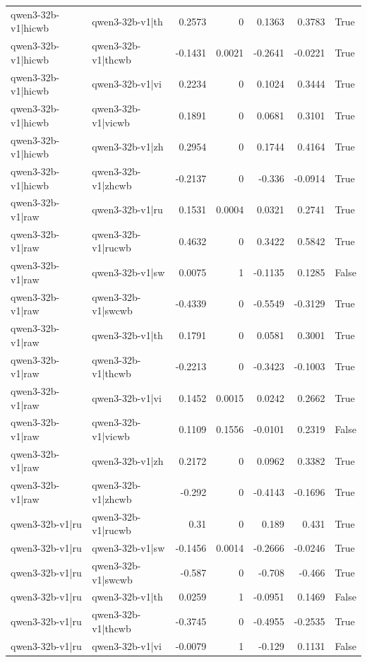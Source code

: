 \begin{table}
\begin{tabular}{l l r r r r l}
qwen3-32b-v1|hicwb & qwen3-32b-v1|th & 0.2573 & 0 & 0.1363 & 0.3783 & True \\
qwen3-32b-v1|hicwb & qwen3-32b-v1|thcwb & -0.1431 & 0.0021 & -0.2641 & -0.0221 & True \\
qwen3-32b-v1|hicwb & qwen3-32b-v1|vi & 0.2234 & 0 & 0.1024 & 0.3444 & True \\
qwen3-32b-v1|hicwb & qwen3-32b-v1|vicwb & 0.1891 & 0 & 0.0681 & 0.3101 & True \\
qwen3-32b-v1|hicwb & qwen3-32b-v1|zh & 0.2954 & 0 & 0.1744 & 0.4164 & True \\
qwen3-32b-v1|hicwb & qwen3-32b-v1|zhcwb & -0.2137 & 0 & -0.336 & -0.0914 & True \\
qwen3-32b-v1|raw & qwen3-32b-v1|ru & 0.1531 & 0.0004 & 0.0321 & 0.2741 & True \\
qwen3-32b-v1|raw & qwen3-32b-v1|rucwb & 0.4632 & 0 & 0.3422 & 0.5842 & True \\
qwen3-32b-v1|raw & qwen3-32b-v1|sw & 0.0075 & 1 & -0.1135 & 0.1285 & False \\
qwen3-32b-v1|raw & qwen3-32b-v1|swcwb & -0.4339 & 0 & -0.5549 & -0.3129 & True \\
qwen3-32b-v1|raw & qwen3-32b-v1|th & 0.1791 & 0 & 0.0581 & 0.3001 & True \\
qwen3-32b-v1|raw & qwen3-32b-v1|thcwb & -0.2213 & 0 & -0.3423 & -0.1003 & True \\
qwen3-32b-v1|raw & qwen3-32b-v1|vi & 0.1452 & 0.0015 & 0.0242 & 0.2662 & True \\
qwen3-32b-v1|raw & qwen3-32b-v1|vicwb & 0.1109 & 0.1556 & -0.0101 & 0.2319 & False \\
qwen3-32b-v1|raw & qwen3-32b-v1|zh & 0.2172 & 0 & 0.0962 & 0.3382 & True \\
qwen3-32b-v1|raw & qwen3-32b-v1|zhcwb & -0.292 & 0 & -0.4143 & -0.1696 & True \\
qwen3-32b-v1|ru & qwen3-32b-v1|rucwb & 0.31 & 0 & 0.189 & 0.431 & True \\
qwen3-32b-v1|ru & qwen3-32b-v1|sw & -0.1456 & 0.0014 & -0.2666 & -0.0246 & True \\
qwen3-32b-v1|ru & qwen3-32b-v1|swcwb & -0.587 & 0 & -0.708 & -0.466 & True \\
qwen3-32b-v1|ru & qwen3-32b-v1|th & 0.0259 & 1 & -0.0951 & 0.1469 & False \\
qwen3-32b-v1|ru & qwen3-32b-v1|thcwb & -0.3745 & 0 & -0.4955 & -0.2535 & True \\
qwen3-32b-v1|ru & qwen3-32b-v1|vi & -0.0079 & 1 & -0.129 & 0.1131 & False \\

\end{tabular}
\end{table}
